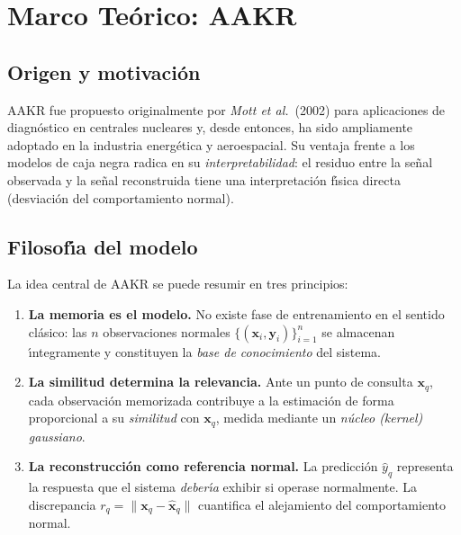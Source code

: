 \documentclass[12pt,a4paper]{article}
\begin{document}
\section{Marco Te\'orico: AAKR}

\subsection{Origen y motivaci\'on}

AAKR fue propuesto originalmente por \emph{Mott et al.}\ (2002) para aplicaciones de
diagn\'ostico en centrales nucleares y, desde entonces, ha sido ampliamente adoptado
en la industria energ\'etica y aeroespacial. Su ventaja frente a los modelos de caja
negra radica en su \emph{interpretabilidad}: el residuo entre la se\~nal observada y
la se\~nal reconstruida tiene una interpretaci\'on f\'{\i}sica directa (desviaci\'on del
comportamiento normal).

\subsection{Filosof\'{\i}a del modelo}

La idea central de AAKR se puede resumir en tres principios:

\begin{enumerate}[leftmargin=2em]
  \item \textbf{La memoria es el modelo.} No existe fase de entrenamiento en el
        sentido cl\'asico: las $n$ observaciones normales
        $\{(\mathbf{x}_i, \mathbf{y}_i)\}_{i=1}^n$ se almacenan \'{\i}ntegramente y
        constituyen la \emph{base de conocimiento} del sistema.

  \item \textbf{La similitud determina la relevancia.} Ante un punto de consulta
        $\mathbf{x}_q$, cada observaci\'on memorizada contribuye a la estimaci\'on de
        forma proporcional a su \emph{similitud} con $\mathbf{x}_q$, medida
        mediante un \emph{n\'ucleo (kernel) gaussiano}.

  \item \textbf{La reconstrucci\'on como referencia normal.} La predicci\'on
        $\hat{y}_q$ representa la respuesta que el sistema \emph{deber\'{\i}a} exhibir
        si operase normalmente. La discrepancia
        $r_q = \|\mathbf{x}_q - \hat{\mathbf{x}}_q\|$ cuantifica el alejamiento del
        comportamiento normal.
\end{enumerate}
\end{document}
